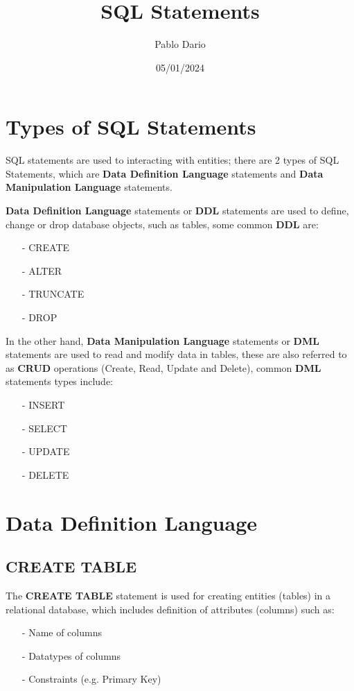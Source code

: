 \documentclass{article}
\title{SQL Statements}
\author{Pablo Dario}
\date{05/01/2024}
\begin{document}
\maketitle
\section{Types of SQL Statements}
 
SQL statements are used to interacting with entities; there are 2 types of SQL Statements, which are \textbf{Data Definition Language} statements and \textbf{Data Manipulation Language} statements.

\textbf{Data Definition Language} statements or \textbf{DDL} statements are used to define, change or drop database objects, such as tables, some common \textbf{DDL} are:
\begin{itemize}
    \item[-] CREATE
    \item[-] ALTER
    \item[-] TRUNCATE
    \item[-] DROP
\end{itemize}

In the other hand, \textbf{Data Manipulation Language} statements or \textbf{DML} statements are used to read and modify data in tables, these are also referred to as \textbf{CRUD} operations (Create, Read, Update and Delete), common \textbf{DML} statements types include:
\begin{itemize}
    \item[-] INSERT
    \item[-] SELECT
    \item[-] UPDATE
    \item[-] DELETE
\end{itemize}

\section{Data Definition Language}

\subsection{CREATE TABLE}

The \textbf{CREATE TABLE} statement is used for creating entities (tables) in a relational database, which includes definition of attributes (columns) such as:

\begin{itemize}
    \item[-] Name of columns
    \item[-] Datatypes of columns
    \item[-] Constraints (e.g. Primary Key) 
\end{itemize}
\end{document}
